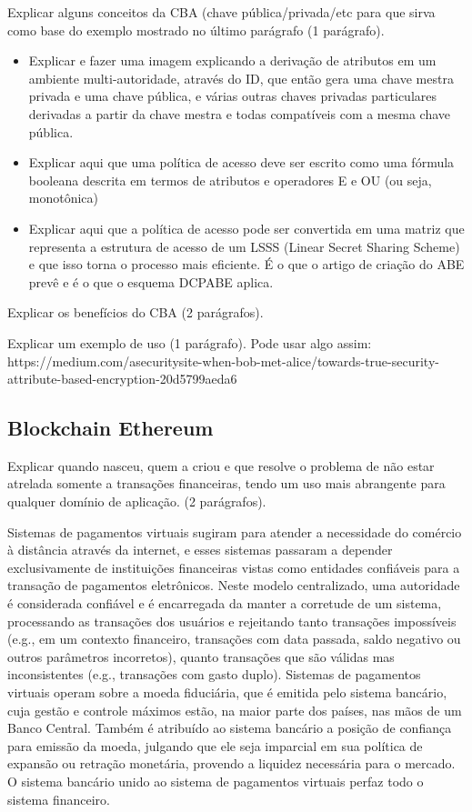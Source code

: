 \documentclass[a4paper,11pt]{article}
\begin{document}
{\color{ForestGreen}Explicar alguns conceitos da CBA (chave pública/privada/etc para que sirva como base do exemplo mostrado no último parágrafo (1 parágrafo).}

\begin{itemize}
  \item Explicar e fazer uma imagem explicando a derivação de atributos em um ambiente multi-autoridade, através do ID, que então gera uma chave mestra privada e uma chave pública, e várias outras chaves privadas particulares derivadas a partir da chave mestra e todas compatíveis com a mesma chave pública.
  \item Explicar aqui que uma política de acesso deve ser escrito como uma fórmula booleana descrita em termos de atributos e operadores E e OU (ou seja, monotônica)
  \item Explicar aqui que a política de acesso pode ser convertida em uma matriz que representa a estrutura de acesso de um LSSS (Linear Secret Sharing Scheme) e que isso torna o processo mais eficiente. É o que o artigo de criação do ABE prevê e é o que o esquema DCPABE aplica.
\end{itemize}

{\color{ForestGreen}Explicar os benefícios do CBA (2 parágrafos).}

{\color{ForestGreen}Explicar um exemplo de uso (1 parágrafo). Pode usar algo assim: https://medium.com/asecuritysite-when-bob-met-alice/towards-true-security-attribute-based-encryption-20d5799aeda6}

\subsection{Blockchain Ethereum}

{\color{ForestGreen}Explicar quando nasceu, quem a criou e que resolve o problema de não estar atrelada somente a transações financeiras, tendo um uso mais abrangente para qualquer domínio de aplicação. (2 parágrafos).}

 Sistemas de pagamentos virtuais sugiram para atender a necessidade do comércio à distância através da internet, e esses sistemas passaram a depender exclusivamente de instituições financeiras vistas como entidades confiáveis para a transação de pagamentos eletrônicos.
 Neste modelo centralizado, uma autoridade é considerada confiável e é encarregada da manter a corretude de um sistema, processando as transações dos usuários e rejeitando tanto transações impossíveis (e.g., em um contexto financeiro, transações com data passada, saldo negativo ou outros parâmetros incorretos), quanto transações que são válidas mas inconsistentes (e.g., transações com gasto duplo).
 Sistemas de pagamentos virtuais operam sobre a moeda fiduciária, que é emitida pelo sistema bancário, cuja gestão e controle máximos estão, na maior parte dos países, nas mãos de um Banco Central. Também é atribuído ao sistema bancário a posição de confiança para emissão da moeda, julgando que ele seja imparcial em sua política de expansão ou retração monetária, provendo a liquidez necessária para o mercado. O sistema bancário unido ao sistema de pagamentos virtuais perfaz todo o sistema financeiro.
\end{document}
